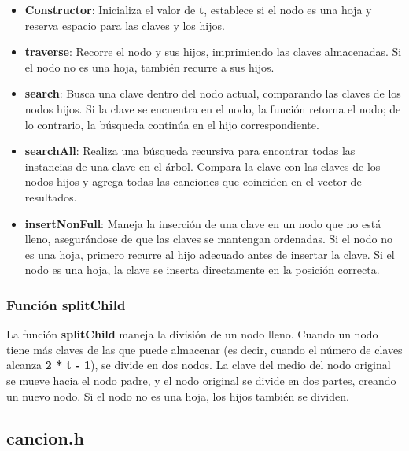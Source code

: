 \documentclass[12pt]{article}
\begin{document}
\begin{flushleft}
                \begin{itemize}[left=4em]
                    \item \textbf{Constructor}: Inicializa el valor de \textbf{t}, establece si el nodo es una hoja y reserva espacio para las claves y los hijos.
                    \item \textbf{traverse}: Recorre el nodo y sus hijos, imprimiendo las claves almacenadas. Si el nodo no es una hoja, también recurre a sus hijos.
                    \item \textbf{search}: Busca una clave dentro del nodo actual, comparando las claves de los nodos hijos. Si la clave se encuentra en el nodo, la función retorna el nodo; de lo contrario, la búsqueda continúa en el hijo correspondiente.
                    \item \textbf{searchAll}: Realiza una búsqueda recursiva para encontrar todas las instancias de una clave en el árbol. Compara la clave con las claves de los nodos hijos y agrega todas las canciones que coinciden en el vector de resultados.
                    \item \textbf{insertNonFull}: Maneja la inserción de una clave en un nodo que no está lleno, asegurándose de que las claves se mantengan ordenadas. Si el nodo no es una hoja, primero recurre al hijo adecuado antes de insertar la clave. Si el nodo es una hoja, la clave se inserta directamente en la posición correcta.
                \end{itemize}
            
            \subsubsection{Función splitChild}
            
                \noindent\hspace*{4em}La función \textbf{splitChild} maneja la división de un nodo lleno. Cuando un nodo tiene más claves de las que puede almacenar (es decir, cuando el número de claves alcanza \textbf{2 * t - 1}), se divide en dos nodos. La clave del medio del nodo original se mueve hacia el nodo padre, y el nodo original se divide en dos partes, creando un nuevo nodo. Si el nodo no es una hoja, los hijos también se dividen.
            
            \subsection{cancion.h}


\end{flushleft}
\end{document}
